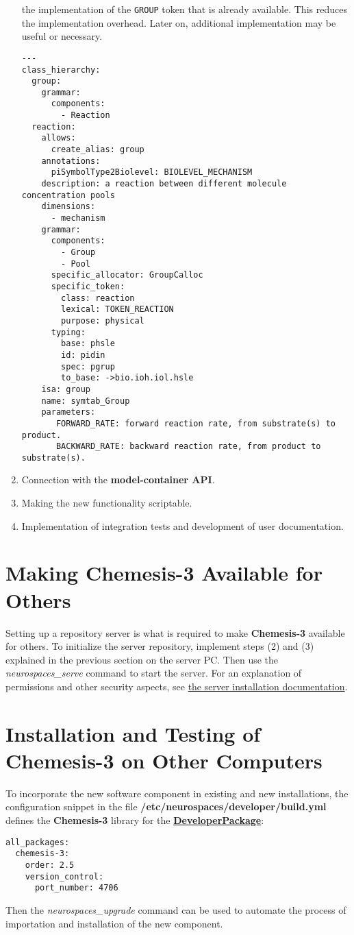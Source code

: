 \documentclass[12pt]{article}
\begin{document}
\begin{enumerate}
  the implementation of the {\tt GROUP} token that is already
  available.  This reduces the implementation overhead.  Later on,
  additional implementation may be useful or necessary.
\begin{verbatim}
---
class_hierarchy:
  group:
    grammar:
      components:
        - Reaction
  reaction:
    allows:
      create_alias: group
    annotations:
      piSymbolType2Biolevel: BIOLEVEL_MECHANISM
    description: a reaction between different molecule concentration pools
    dimensions:
      - mechanism
    grammar:
      components:
        - Group
        - Pool
      specific_allocator: GroupCalloc
      specific_token:
        class: reaction
        lexical: TOKEN_REACTION
        purpose: physical
      typing:
        base: phsle
        id: pidin
        spec: pgrup
        to_base: ->bio.ioh.iol.hsle
    isa: group
    name: symtab_Group
    parameters:
       FORWARD_RATE: forward reaction rate, from substrate(s) to product.
       BACKWARD_RATE: backward reaction rate, from product to substrate(s).
\end{verbatim}
\item Connection with the {\bf model-container API}.
\item Making the new functionality scriptable.
\item Implementation of integration tests and development of user
  documentation.
\end{enumerate}


\section*{Making {\bf Chemesis-3} Available for Others}

Setting up a repository server is what is required to make {\bf
  Chemesis-3} available for others.  To initialize the server
repository, implement steps (2) and (3) explained in the previous
section on the server PC.  Then use the {\it neurospaces\_serve}
command to start the server.  For an explanation of permissions and
other security aspects, see
\href{../installation-debian-server/installation-debian-server.html}{the
  server installation documentation}.


\section*{Installation and Testing of {\bf Chemesis-3} on Other Computers}

To incorporate the new software component in existing and new
installations, the configuration snippet in the file {\bf
  /etc/neurospaces/developer/build.yml} defines the {\bf Chemesis-3}
library for the \href{../developer-package/developer-package.tex}{\bf
  DeveloperPackage}:
\begin{verbatim}
all_packages:
  chemesis-3:
    order: 2.5
    version_control:
      port_number: 4706
\end{verbatim}
Then the {\it neurospaces\_upgrade} command can be used to automate
the process of importation and installation of the new component.





\end{document}
